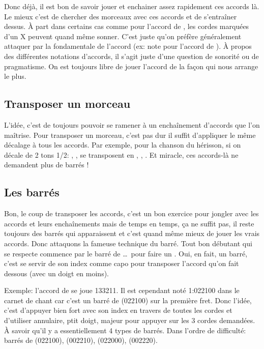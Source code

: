 \documentclass[versionenligne]{patacrep}
\begin{document}
Donc déjà, il est bon de savoir jouer et enchainer assez rapidement
ces accords là. Le mieux c'est de chercher des morceaux avec ces
accords et de s'entraîner dessus.  À part dans certains cas comme pour
l'accord de , les cordes marquées d'un X peuvent quand
même sonner.  C'est juste qu'on préfère généralement attaquer par la
fondamentale de l'accord (ex: note  pour l'accord de
).  À propos des différentes notations d'accords,
il s'agit juste d'une question de sonorité ou de pragmatisme. On est
toujours libre de jouer l'accord de la façon qui nous arrange le plus.

\subsection{Transposer un morceau}

L'idée, c'est de toujours pouvoir se ramener à un enchaînement
d'accords que l'on maîtrise.  Pour transposer un morceau, c'est pas
dur il suffit d'appliquer le même décalage à tous les accords.  Par
exemple, pour la chanson du hérisson, si on décale de 2 tons 1/2:
, ,  se transposent en
, , .  Et miracle, ces accords-là ne demandent plus de barrés !

\subsection{Les barrés}

Bon, le coup de transposer les accords, c'est un bon exercice pour
jongler avec les accords et leurs enchaînements mais de temps en
temps, ça ne suffit pas, il reste toujours des barrés qui apparaissent
et c'est quand même mieux de jouer les vrais accords. Donc attaquons
la fameuse technique du barré. Tout bon débutant qui se respecte
commence par le barré de  \dots\, pour faire un
. Oui, en fait, un barré, c'est se servir de son index comme
capo pour transposer l'accord qu'on fait dessous (avec un doigt en
moins).

Exemple: l'accord de  se joue 133211. Il est cependant
noté 1:022100 dans le carnet de chant car c'est un barré de
 (022100) sur la première fret.  Donc l'idée, c'est
d'appuyer bien fort avec son index en travers de toutes les cordes et
d'utiliser annulaire, ptit doigt, majeur pour appuyer sur les 3 cordes
demandées. À savoir qu'il y a essentiellement 4 types de barrés.  Dans
l'ordre de difficulté: barrés de  (022100), 
(002210),  (022000),  (002220).
\end{document}
